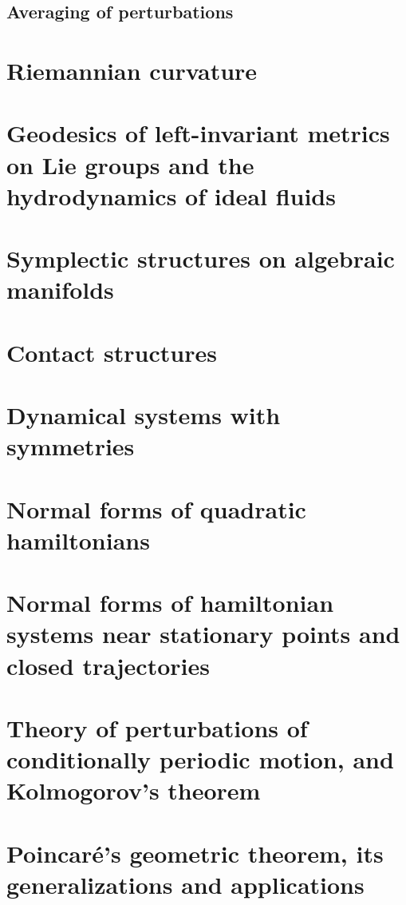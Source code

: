 \documentclass{book}
\numberwithin{equation}{section}
\theoremstyle{plain}
\theoremstyle{definition}
\theoremstyle{remark}
\theoremstyle{remark}
\begin{document}
\section{Averaging of perturbations}

\appendix
\renewcommand{\thechapter}{\arabic{chapter}}

\chapter{Riemannian curvature}

\chapter{Geodesics of left-invariant metrics on Lie groups and
the hydrodynamics of ideal fluids}

\chapter{Symplectic structures on algebraic manifolds}

\chapter{Contact structures}

\chapter{Dynamical systems with symmetries}

\chapter{Normal forms of quadratic hamiltonians}

\chapter{Normal forms of hamiltonian systems near stationary points
and closed trajectories}

\chapter{Theory of perturbations of conditionally periodic motion,
and Kolmogorov's theorem}

\chapter{Poincar\'e's geometric theorem, its generalizations and
applications}
\end{document}
